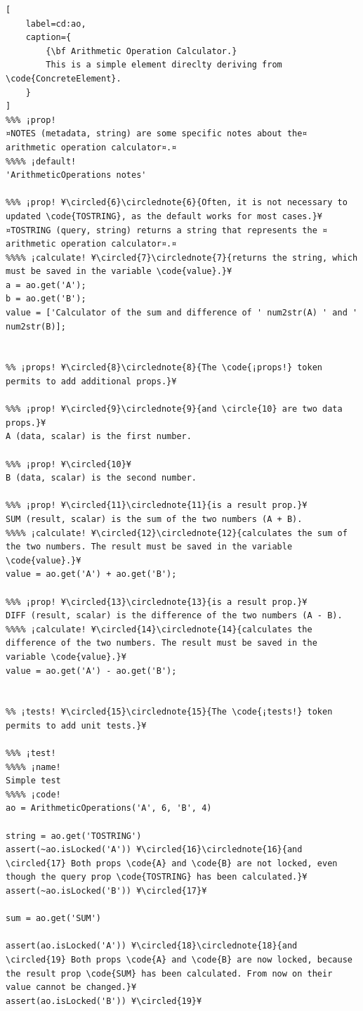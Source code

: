 \documentclass{tufte-handout}
\begin{document}
\begin{lstlisting}[
	label=cd:ao,
	caption={
		{\bf Arithmetic Operation Calculator.}
		This is a simple element direclty deriving from \code{ConcreteElement}.
	}
]
%%% ¡prop!
¤NOTES (metadata, string) are some specific notes about the¤ arithmetic operation calculator¤.¤
%%%% ¡default!
'ArithmeticOperations notes'

%%% ¡prop! ¥\circled{6}\circlednote{6}{Often, it is not necessary to updated \code{TOSTRING}, as the default works for most cases.}¥
¤TOSTRING (query, string) returns a string that represents the ¤ arithmetic operation calculator¤.¤
%%%% ¡calculate! ¥\circled{7}\circlednote{7}{returns the string, which must be saved in the variable \code{value}.}¥
a = ao.get('A');
b = ao.get('B');
value = ['Calculator of the sum and difference of ' num2str(A) ' and ' num2str(B)];


%% ¡props! ¥\circled{8}\circlednote{8}{The \code{¡props!} token permits to add additional props.}¥

%%% ¡prop! ¥\circled{9}\circlednote{9}{and \circle{10} are two data props.}¥
A (data, scalar) is the first number.

%%% ¡prop! ¥\circled{10}¥
B (data, scalar) is the second number.

%%% ¡prop! ¥\circled{11}\circlednote{11}{is a result prop.}¥
SUM (result, scalar) is the sum of the two numbers (A + B).
%%%% ¡calculate! ¥\circled{12}\circlednote{12}{calculates the sum of the two numbers. The result must be saved in the variable \code{value}.}¥
value = ao.get('A') + ao.get('B');

%%% ¡prop! ¥\circled{13}\circlednote{13}{is a result prop.}¥
DIFF (result, scalar) is the difference of the two numbers (A - B).
%%%% ¡calculate! ¥\circled{14}\circlednote{14}{calculates the difference of the two numbers. The result must be saved in the variable \code{value}.}¥
value = ao.get('A') - ao.get('B');


%% ¡tests! ¥\circled{15}\circlednote{15}{The \code{¡tests!} token permits to add unit tests.}¥

%%% ¡test!
%%%% ¡name!
Simple test
%%%% ¡code!
ao = ArithmeticOperations('A', 6, 'B', 4)

string = ao.get('TOSTRING')
assert(~ao.isLocked('A')) ¥\circled{16}\circlednote{16}{and \circled{17} Both props \code{A} and \code{B} are not locked, even though the query prop \code{TOSTRING} has been calculated.}¥
assert(~ao.isLocked('B')) ¥\circled{17}¥

sum = ao.get('SUM')

assert(ao.isLocked('A')) ¥\circled{18}\circlednote{18}{and \circled{19} Both props \code{A} and \code{B} are now locked, because the result prop \code{SUM} has been calculated. From now on their value cannot be changed.}¥
assert(ao.isLocked('B')) ¥\circled{19}¥


\end{lstlisting}
\end{document}
